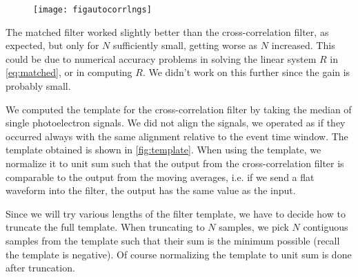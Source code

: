 
\begin{figure}
    \hspace{0.00\textwidth}
    \texttt{[image: figautocorrlngs]}
    

\end{figure}

The matched filter worked slightly better than the cross-correlation filter, as
expected, but only for $N$ sufficiently small, getting worse as $N$ increased.
This could be due to numerical accuracy problems in solving the linear system
$R$ in \autoref{eq:matched}, or in computing $R$. We didn't work on this
further since the gain is probably small.


We computed the template for the cross-correlation filter by taking the median
of single photoelectron signals. We did not align the signals, we operated as
if they occurred always with the same alignment relative to the event time
window. The template obtained is shown in \autoref{fig:template}. When using
the template, we normalize it to unit sum such that the output from the
cross-correlation filter is comparable to the output from the moving averages,
i.e. if we send a flat waveform into the filter, the output has the same value
as the input.



Since we will try various lengths of the filter template, we have to decide how
to truncate the full template. When truncating to $N$ samples, we pick $N$
contiguous samples from the template such that their sum is the minimum
possible (recall the template is negative). Of course normalizing the template
to unit sum is done after truncation.

